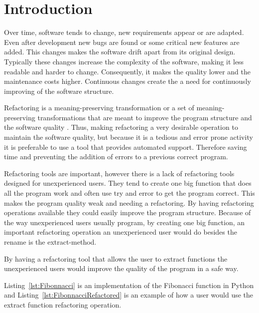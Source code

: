 
% 
% 

\section{Introduction}


Over time, software tends to change, new requirements appear or are adapted. 
Even after development new bugs are found or some critical new features are added.
This changes makes the software drift apart from its original design.
Typically these changes increase the complexity of the software, making it less readable and harder to change. 
Consequently, it makes the quality lower and the maintenance costs higher.
Continuous changes create the a need for continuously improving of the software structure.

Refactoring is a meaning-preserving transformation or a set of meaning-preserving transformations that are meant to improve the program structure and the software quality \cite{bourquin2007high}.
Thus, making refactoring a very desirable operation to maintain the software quality, but because it is a tedious and error prone activity it is preferable to use a tool that provides automated support. %
Therefore saving time and preventing the addition of errors to a previous correct program.

%
Refactoring tools are important, however there is a lack of refactoring tools designed for unexperienced users.
They tend to create one big function that does all the program work and often use try and error to get the program correct.
This makes the program quality weak and needing a refactoring. 
By having refactoring operations available they could easily improve the program structure.
Because of the way unexperienced users usually program, by creating one big function, an important refactoring operation an unexperienced user would do besides the rename is the extract-method. 

By having a refactoring tool that allows the user to extract functions the unexperienced users would improve the quality of the program in a safe way.

 Listing~\ref{lst:Fibonnacci} is an implementation of the Fibonacci function in Python and Listing~\ref{lst:FibonnacciRefactored} is an example of how a user would use the extract function refactoring operation.

